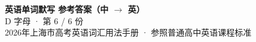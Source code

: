 \documentclass[10pt,a4paper]{article}
\begin{document}
\pagestyle{plain}

\begin{center}
{\LARGE\bfseries 英语单词默写 \quad 参考答案（中 $\to$ 英）}\\[0.22em]
{\large D 字母 · 第 6 / 6 份}\\[0.18em]
{\small 2026年上海市高考英语词汇用法手册 · 参照普通高中英语课程标准}
\end{center}

\vspace{0.2em}
\noindent{\color{rulegray}\rule{\textwidth}{0.8pt}}

\vspace{0.35em}

\vspace{0.25em}
\renewcommand{\arraystretch}{1.32}
\end{document}
